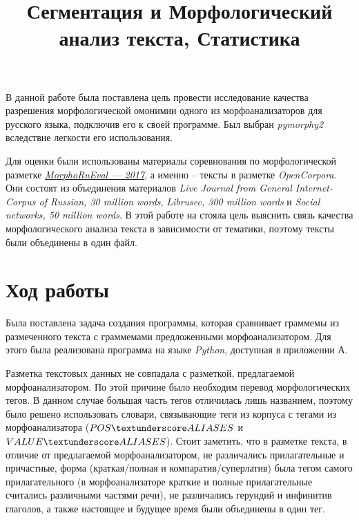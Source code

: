 \documentclass[14pt,a4paper]{extarticle}
\title{Сегментация и Морфологический анализ текста, Статистика}
\begin{document}
	\maketitle
	
	\tableofcontents
	
	\begin{introduction}
		
		В данной работе была поставлена цель провести исследование качества разрешения морфологической омонимии одного из морфоанализаторов для русского языка, подключив его к своей программе. Был выбран \textit{pymorphy2} вследствие легкости его использования.
		
		Для оценки были использованы материалы соревнования по морфологической разметке \textit{\href{https://github.com/dialogue-evaluation/morphoRuEval-2017}{MorphoRuEval --- 2017}}, а именно -- тексты в разметке \textit{OpenCorpora}. Они состоят из объединения материалов \textit{Live Journal from General Internet-Corpus of Russian, 30 million words}, \textit{Librusec, 300 million words} и \textit{Social networks, 50 million words}. В этой работе на стояла цель выяснить связь качества морфологического анализа текста в зависимости от тематики, поэтому тексты были объединены в один файл.
	\end{introduction}
	
	\section{Ход работы}
	
		Была поставлена задача создания программы, которая сравнивает граммемы из размеченного текста с граммемами предложенными морфоанализатором. Для этого была реализована программа на языке \textit{Python}, доступная в приложении А.
		
		Разметка текстовых данных не совпадала с разметкой, предлагаемой морфоанализатором. По этой причине было необходим перевод морфологических тегов. В данном случае большая часть тегов отличилась лишь названием, поэтому было решено использовать словари, связывающие теги из корпуса с тегами из морфоанализатора ($POS\textunderscore ALIASES$ и $VALUE\textunderscore ALIASES$). Стоит заметить, что в разметке текста, в отличие от предлагаемой морфоанализатором, не различались прилагательные и причастные, форма (краткая/полная и компаратив/суперлатив) была тегом самого прилагательного (в морфоанализаторе краткие и полные прилагательные считались различными частями речи), не различались герундий и инфинитив глаголов, а также настоящее и будущее время были объединены в один тег.
		
\end{document}
